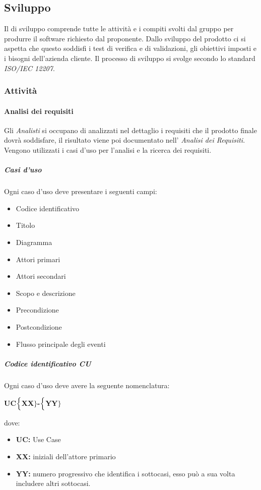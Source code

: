 \subsection{Sviluppo}
Il  di sviluppo comprende tutte le attività e i compiti svolti dal gruppo per produrre il software richiesto dal proponente. Dallo sviluppo del prodotto ci si aspetta che questo soddisfi i test di verifica e di validazioni, gli obiettivi imposti e i bisogni dell'azienda cliente. Il processo di sviluppo si svolge secondo lo standard \textit{ISO/IEC 12207}.

\subsubsection{Attività}

\paragraph{Analisi dei requisiti}
Gli \textit{Analisti} si occupano di analizzati nel dettaglio i requisiti che il prodotto finale dovrà soddisfare, il risultato viene poi documentato nell' \textit{Analisi dei Requisiti}. Vengono utilizzati i casi d'uso per l'analisi e la ricerca dei requisiti.

\subparagraph{Casi d'uso}
Ogni caso d'uso deve presentare i seguenti campi:
\begin{itemize}
	\item Codice identificativo
	\item Titolo
	\item Diagramma 
	\item Attori primari
	\item Attori secondari
	\item Scopo e descrizione
	\item Precondizione
	\item Postcondizione
	\item Flusso principale degli eventi
\end{itemize}

\subparagraph{Codice identificativo CU}
Ogni caso d'uso deve avere la seguente nomenclatura:

\begin{center}
	\textbf{UC$\Bigl\{$XX$\Bigr\}$-$\Bigl\{$YY$\Bigr\}$}
\end{center}
dove:
\begin{itemize}
	\item \textbf{UC:} Use Case
	\item \textbf{{XX}:} iniziali dell'attore primario
	\item \textbf{{YY}:} numero progressivo che identifica i sottocasi, esso può a sua volta includere altri sottocasi.
\end{itemize}

